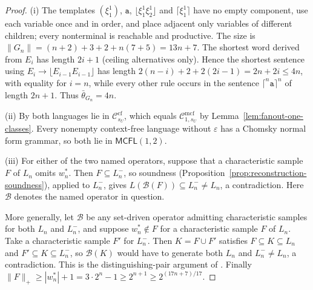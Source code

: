 \documentclass[11pt]{article}
\numberwithin{equation}{section}
\theoremstyle{plain}
\theoremstyle{definition}
\theoremstyle{remark}
\newcommand{\Cmcf}[2]{\mathcal{C}^{\mathrm{mcf}}_{#1,#2}}
\newcommand{\eps}{\varepsilon}
\theoremstyle{plain}
\begin{document}
\begin{proof}
(i) The templates $(\xi_1^1)$, $\mathtt a$,
$\lfloor\xi_1^1\xi_2^1\rfloor$ and $\lceil\xi_1^1\rceil$ have no empty
component, use each variable once and in order, and place adjacent only
variables of different children; every nonterminal is reachable and
productive.  The size is
$\|G_n\|=(n+2)+3+2+n(7+5)=13n+7$.  The shortest word derived from $E_i$
has length $2i+1$ (ceiling alternatives only).  Hence the shortest
sentence using $E_i\to\lfloor E_{i-1}E_{i-1}\rfloor$ has length
$2(n-i)+2+2(2i-1)=2n+2i\le4n$, with equality for $i=n$, while every other
rule occurs in the sentence $\lceil^n\mathtt a\rceil^n$ of length $2n+1$.
Thus $\bar\theta_{G_n}=4n$.

(ii) By \cite[Proposition~6.4(i),(iv)]{kuriyamaCFG} both languages lie in
$\mathcal C^{\mathrm{cf}}_{s_U}$, which equals $\Cmcf{1}{s_U}$ by
Lemma~\ref{lem:fanout-one-classes}.  Every nonempty context-free language
without $\eps$ has a Chomsky normal form grammar, so both lie in
$\mathsf{MCFL}(1,2)$.

(iii) For either of the two named operators, suppose that a
characteristic sample $F$ of $L_n$ omits $w_n^*$.  Then
$F\subseteq L_n^-$, so soundness
(Proposition~\ref{prop:reconstruction-soundness}), applied to $L_n^-$,
gives $L(\mathcal B(F))\subseteq L_n^-\ne L_n$, a contradiction.
Here $\mathcal B$ denotes the named operator in question.

More generally, let $\mathcal B$ be any set-driven operator admitting
characteristic samples for both $L_n$ and $L_n^-$, and suppose
$w_n^*\notin F$ for a characteristic sample $F$ of $L_n$.
Take a characteristic sample $F'$ for $L_n^-$.
Then $K=F\cup F'$ satisfies $F\subseteq K\subseteq L_n$ and
$F'\subseteq K\subseteq L_n^-$, so $\mathcal B(K)$ would have to
generate both $L_n$ and $L_n^-\ne L_n$, a contradiction.
This is the distinguishing-pair argument of
\cite[Proposition~6.4(iv)]{kuriyamaCFG}.  Finally
$\|F\|_+\ge|w^*_n|+1=3\cdot2^n-1\ge2^{n+1}\ge2^{(17n+7)/17}$.
\end{proof}
\end{document}
